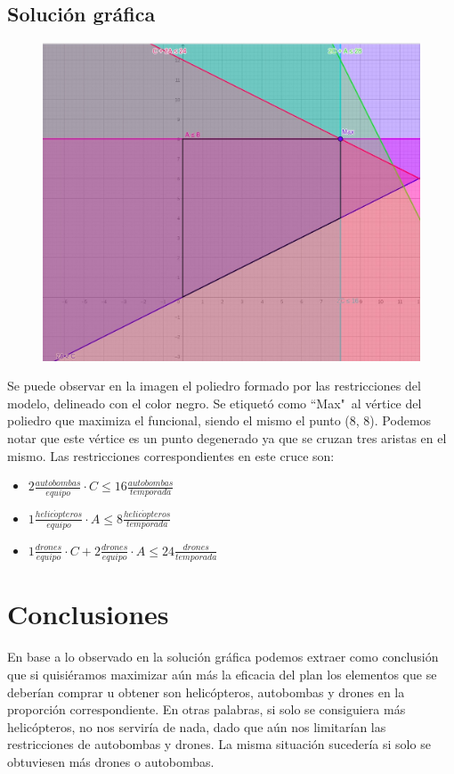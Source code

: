 \documentclass[12pt]{article}
\begin{document}
\resizebox{0.82\textwidth}{!}{\usebox\myv}

\newpage

\subsection{Solución gráfica}

\begin{figure}[htbp]
    \centering
    \includegraphics[width=1\textwidth]{../assets/resolucion-grafica.jpeg}
\end{figure}

Se puede observar en la imagen el poliedro formado por las restricciones del modelo,
delineado con el color negro. Se etiquetó como ``Max"\ al vértice del poliedro
que maximiza el funcional, siendo el mismo el punto (8, 8). Podemos notar que este
vértice es un punto degenerado ya que se cruzan tres aristas en el mismo. Las restricciones
correspondientes en este cruce son:

\begin{itemize}
    \item $2 \frac{autobombas}{equipo} \cdot C \leq 16 \frac{autobombas}{temporada}$
    \item $1 \frac{helic\acute{o}pteros}{equipo} \cdot A \leq 8 \frac{helic\acute{o}pteros}{temporada}$
    \item $1 \frac{drones}{equipo} \cdot C + 2 \frac{drones}{equipo} \cdot A \leq 24 \frac{drones}{temporada}$
\end{itemize}

\section{Conclusiones}

En base a lo observado en la solución gráfica podemos extraer como conclusión que si quisiéramos maximizar aún más
la eficacia del plan los elementos que se deberían comprar u obtener son helicópteros, autobombas
y drones en la proporción correspondiente. En otras palabras, si solo se consiguiera más helicópteros,
no nos serviría de nada, dado que aún nos limitarían las restricciones de autobombas y drones.
La misma situación sucedería si solo se obtuviesen más drones o autobombas.
\end{document}
